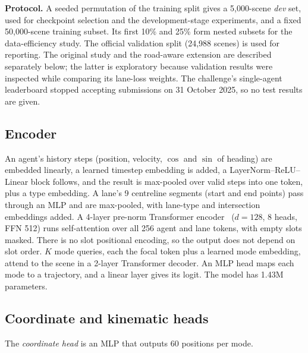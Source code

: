 \documentclass[conference]{IEEEtran}
\begin{document}
\textbf{Protocol.} A seeded permutation of the training split gives a 5,000-scene \emph{dev} set,
used for checkpoint selection and the development-stage experiments, and a fixed 50,000-scene training subset. Its first 10\% and 25\%
form nested subsets for the data-efficiency study. The official validation split (24,988 scenes) is used for reporting. The original study and the
road-aware extension are described separately below; the latter is exploratory because validation
results were inspected while comparing its lane-loss weights. The challenge's single-agent leaderboard stopped accepting submissions
on 31 October 2025, so no test results are given.

\subsection{Encoder}
An agent's history steps (position, velocity, $\cos$ and $\sin$ of heading) are embedded linearly,
a learned timestep embedding is added, a LayerNorm--ReLU--Linear block follows, and the result is
max-pooled over valid steps into one token, plus a type embedding. A lane's 9 centreline segments
(start and end points) pass through an MLP and are max-pooled, with lane-type and intersection
embeddings added. A 4-layer pre-norm Transformer encoder~\cite{vaswani2017attention} ($d{=}128$,
8 heads, FFN 512) runs self-attention over all 256 agent and lane tokens, with empty slots masked.
There is no slot positional encoding, so the output does not depend on slot order. $K$ mode
queries, each the focal token plus a learned mode embedding, attend to the scene in a 2-layer
Transformer decoder. An MLP head maps each mode to a trajectory, and a linear layer gives its
logit. The model has 1.43M parameters.

\subsection{Coordinate and kinematic heads}
The \emph{coordinate head} is an MLP that outputs 60 positions per mode.
\end{document}
